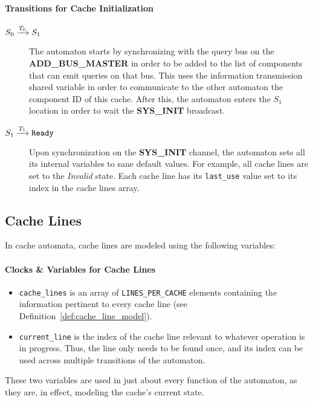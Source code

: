 \paragraph{Transitions for Cache Initialization}
\begin{description}
\item[$S_0 \xrightarrow[]{T_0} S_1$]
   The automaton starts by synchronizing with the query bus on the
   \textbf{ADD\_BUS\_MASTER} in order to be added to the list of components that
   can emit queries on that bus. This uses the information transmission shared
   variable in order to communicate to the other automaton the component ID of
   this cache. After this, the automaton enters the $S_1$ location in order to
   wait the \textbf{SYS\_INIT} broadcast.

\item[$S_1 \xrightarrow[]{T_1} \texttt{Ready}$]
   Upon synchronization on the \textbf{SYS\_INIT} channel, the automaton sets
   all its internal variables to sane default values. For example, all cache
   lines are set to the \textit{Invalid} state. Each cache line has its
   \lstinline!last_use! value set to its index in the cache lines array.
\end{description}

\subsection{Cache Lines}
In cache automata, cache lines are modeled using the following variables:
\paragraph{Clocks \& Variables for Cache Lines}
\begin{itemize}
\item
   \lstinline!cache_lines! is an array of \lstinline!LINES_PER_CACHE!
   elements containing the information pertinent to every cache line (see
   Definition~\ref{def:cache_line_model}).
\item
   \lstinline!current_line! is the index of the cache line relevant to whatever
   operation is in progress. Thus, the line only needs to be found once, and its
   index can be used across multiple transitions of the automaton.
\end{itemize}
These two variables are used in just about every function of the automaton, as
they are, in effect, modeling the cache's current state.

